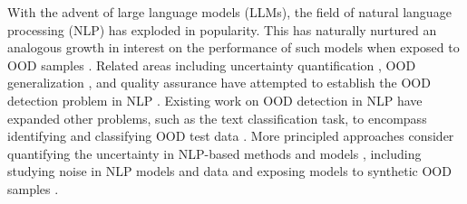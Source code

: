 With the advent of large language models (LLMs), the field of natural language processing (NLP) has exploded in popularity. This has naturally nurtured an analogous growth in interest on the performance of such models when exposed to OOD samples \cite{baran2023classical,lang2023survey,xu2024large,yang2023out}. Related areas including uncertainty quantification \cite{chen2024reconfidencing,ma2025estimating,xiong2024can,ye2024benchmarking}, OOD generalization \cite{wang2024can}, and quality assurance \cite{ouyang2025textual} have attempted to establish the OOD detection problem in NLP \cite{zhou2023navigating}. Existing work on OOD detection in NLP have expanded other problems, such as the text classification task, to encompass identifying and classifying OOD test data \cite{zheng2020out,toth2024classification,garg2021towards}. More principled approaches consider quantifying the uncertainty in NLP-based methods and models \cite{da2024llm,xiong2024can,tian2023just}, including studying noise in NLP models and data \cite{al2021towards,chen2023automatic} and exposing models to synthetic OOD samples \cite{li2024conan,kim2023pseudo}.

